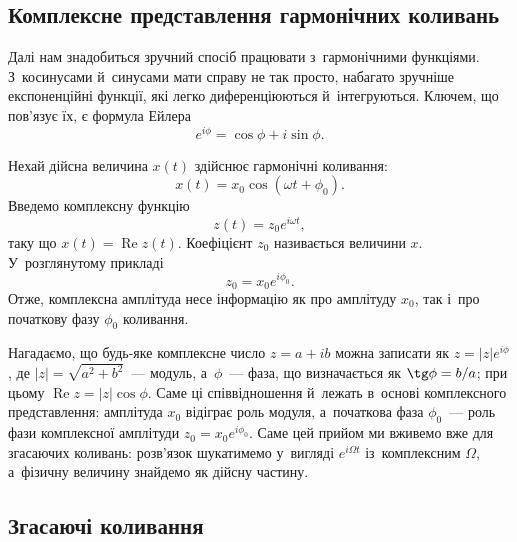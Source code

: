 \subsection*{Комплексне представлення гармонічних коливань}

Далі нам знадобиться зручний спосіб працювати з~гармонічними функціями. З~косинусами й~синусами мати справу не так просто, набагато зручніше експоненційні функції, які легко диференціюються й~інтегруються. Ключем, що пов'язує їх, є формула Ейлера
\begin{equation*}
e^{i\phi} = \cos\phi + i\sin\phi.
\end{equation*}

Нехай дійсна величина $x(t)$ здійснює гармонічні коливання:
\begin{equation*}
x(t) = x_0 \cos(\omega t + \phi_0).
\end{equation*}
Введемо комплексну функцію
\begin{equation*}
z(t) = z_0 e^{i\omega t},
\end{equation*}
таку що $x(t) = \operatorname{Re} z(t)$. Коефіцієнт $z_0$ називається  величини $x$. У~розглянутому прикладі
\begin{equation*}
z_0 = x_0 e^{i\phi_0}.
\end{equation*}
Отже, комплексна амплітуда несе інформацію як про амплітуду $x_0$, так і~про початкову фазу $\phi_0$ коливання.

Нагадаємо, що будь-яке комплексне число $z = a + ib$ можна записати як $z = |z| e^{i\phi}$, де $|z| = \sqrt{a^2 + b^2}$~--- модуль, а~$\phi$~--- фаза, що визначається як $\tg\phi = b/a$; при цьому $\operatorname{Re} z = |z|\cos\phi$. Саме ці співвідношення й~лежать в~основі комплексного представлення: амплітуда $x_0$ відіграє роль модуля, а~початкова фаза $\phi_0$~--- роль фази комплексної амплітуди $z_0 = x_0 e^{i\phi_0}$.
Саме цей прийом ми вживемо вже для згасаючих коливань: розв'язок шукатимемо у~вигляді $e^{i\Omega t}$ із~комплексним $\Omega$, а~фізичну величину знайдемо як дійсну частину.

\subsection*{Згасаючі коливання}

